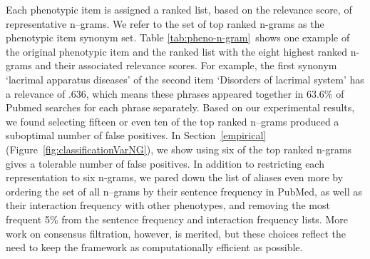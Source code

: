 \documentclass{sig-alternate-05-2015}
\newcommand{\kibitz}[2]{\ifnum\Comments=1\textcolor{#1}{#2}\fi}
\newcommand{\joyce}[1]{\kibitz{purple}      {[Joyce: #1]}}
\newcommand{\jette}[1]{\kibitz{red}      {[Jette: #1]}}
\begin{document}
Each phenotypic item is assigned a ranked list, based on the relevance score, of representative n--grams.
We refer to the set of top ranked n-grams as the phenotypic item synonym set.
Table \ref{tab:pheno-n-gram}~shows one example of the original phenotypic item and the ranked list with the eight highest ranked n-grams and their associated relevance scores.
For example, the first synonym `lacrimal apparatus diseases' of the second item `Disorders of lacrimal system' has a relevance of .636, which means  these phrases appeared together in 63.6\% of Pubmed searches for each phrase separately.
Based on our experimental results, we found selecting fifteen or even ten of the top ranked n--grams produced a suboptimal number of false positives. 
In Section~\ref{empirical} (Figure~\ref{fig:classificationVarNG}), we show using six of the top ranked n-grams gives a tolerable number of false positives.
In addition to restricting each representation to six n-grams, we pared down the list of aliases even more by ordering the set of all n--grams by their sentence frequency in PubMed, as well as their interaction frequency with other phenotypes, and removing the most frequent 5\% from the sentence frequency and interaction frequency lists.
More work on consensus filtration, however, is merited, but these choices reflect the need to keep the framework as computationally efficient as possible.


\end{document}
